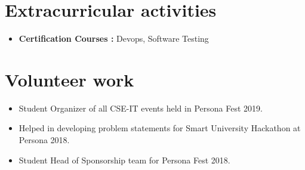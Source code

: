 \documentclass[letterpaper,11pt]{article}
\newcommand{\resumeItem}[2]{
  \item\small{
    \textbf{#1}{ #2 \vspace{-2pt}}
  }
}
\newcommand{\resumeSubItem}[2]{\resumeItem{#1}{#2}\vspace{-4pt}}
\newcommand{\resumeSubHeadingListStart}{\begin{itemize}[leftmargin=*]}
\newcommand{\resumeSubHeadingListEnd}{\end{itemize}}
\begin{document}
\section{Extracurricular activities}
  \resumeSubHeadingListStart
    \resumeSubItem{Certification Courses :}{Devops, Software Testing}
  \resumeSubHeadingListEnd
  

\section{Volunteer work}
  \resumeSubHeadingListStart
    \resumeSubItem{}{Student Organizer of all CSE-IT events held in Persona Fest 2019.}
    \resumeSubItem{}{Helped in developing problem statements for Smart University Hackathon at Persona 2018.}
    \resumeSubItem{}{Student Head of Sponsorship team for Persona Fest 2018.}
  \resumeSubHeadingListEnd



\end{document}
